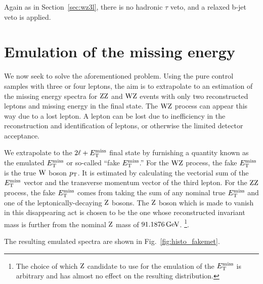 Again as in Section~\ref{sec:wz3l}, there is no hadronic $\tau$ veto, and a relaxed b-jet veto is applied.

\section{Emulation of the missing energy}
\label{sec:fakemet}
We now seek to solve the aforementioned problem. 
Using the pure control samples with three or four leptons, the aim is to extrapolate
to an estimation of the missing energy spectra for $\mathrm{Z}\mathrm{Z}$ and $\mathrm{W}\mathrm{Z}$ events 
with only two reconstructed leptons and missing energy in the final state.
The $\mathrm{W}\mathrm{Z}$ process can appear this way due to a lost lepton.
A lepton can be lost due to inefficiency in the reconstruction and identification of leptons, or otherwise the limited detector acceptance.

We extrapolate to the $2\ell+E_\mathrm{T}^{\mathrm{miss}}$ final state by furnishing a quantity known as the emulated $E_\mathrm{T}^{\mathrm{miss}}$ or so-called ``fake $E_\mathrm{T}^{\mathrm{miss}}$.''
For the $\mathrm{W}\mathrm{Z}$ process, the fake $E_\mathrm{T}^{\mathrm{miss}}$ is the true $\mathrm{W}$ boson $p_{\mathrm{T}}$.
It is estimated by calculating the vectorial sum of the $E_\mathrm{T}^{\mathrm{miss}}$ vector and the transverse momentum vector of the third lepton.
For the $\mathrm{Z}\mathrm{Z}$ process, the fake $E_\mathrm{T}^{\mathrm{miss}}$ comes from taking the sum of any nominal true $E_\mathrm{T}^{\mathrm{miss}}$ and one of the leptonically-decaying $\mathrm{Z}$ bosons.
The $\mathrm{Z}$ boson which is made to vanish in this disappearing act is chosen to be the one whose reconstructed invariant mass is further from the
nominal $\mathrm{Z}$ mass of $91.1876 \,\text{Ge\hspace{-.08em}V}$.
\footnote{The choice of which $\mathrm{Z}$ candidate to use for the emulation of the $E_\mathrm{T}^{\mathrm{miss}}$ is arbitrary and has almost no effect on the resulting distribution.}.

The resulting emulated \met spectra are shown in Fig.~\ref{fig:histo_fakemet}.

